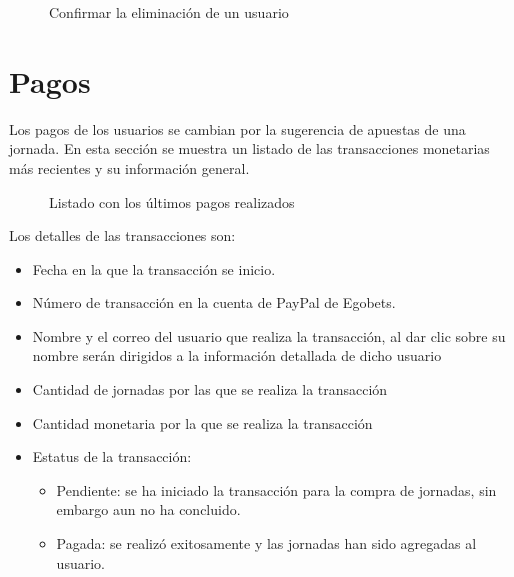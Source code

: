 \begin{figure}[!htb]\centering
   \begin {minipage}{0.5\textwidth}
     \caption[Confirmar la eliminación de un usuario]{Confirmar la eliminación de un usuario\footnotemark}
	 \label{Fig:Eliminar-usuario}
   \end{minipage}
\end{figure}


\section{Pagos}
Los pagos de los usuarios se cambian por la sugerencia de apuestas de una jornada. En esta sección se muestra un listado de las transacciones monetarias más recientes y su información general.

\begin{figure}[!htb]\centering
   \begin {minipage}{1\textwidth}
     \caption{Listado con los últimos pagos realizados}
	 \label{Fig:Transacciones}
   \end{minipage}
\end{figure}

Los detalles de las transacciones son:
\begin{itemize}
	\item Fecha en la que la transacción se inicio.
	\item Número de transacción en la cuenta de PayPal de Egobets.
	\item Nombre y el correo del usuario que realiza la transacción, al dar clic sobre su nombre serán dirigidos a la información detallada de dicho usuario
	\item Cantidad de jornadas por las que se realiza la transacción
	\item Cantidad monetaria por la que se realiza la transacción
	\item Estatus de la transacción:
	\begin{itemize}
		\item Pendiente: se ha iniciado la transacción para la compra de jornadas, sin embargo aun no ha concluido.
		\item Pagada: se realizó exitosamente y las jornadas han sido agregadas al usuario.
	\end{itemize}
\end{itemize}

